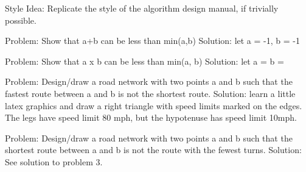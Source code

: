Style Idea: Replicate the style of the algorithm design manual, if trivially possible.

Problem: Show that a+b can be less than min(a,b)
Solution: let a = -1, b = -1

Problem: Show that a x b can be less than min(a, b)
Solution: let a = b = 

Problem: Design/draw a road network with two points a and b such that the fastest route between a and b is not the shortest route.
Solution: learn a little latex graphics and draw a right triangle with speed limits marked on the edges. The legs have speed limit 80 mph, but the hypotenuse has speed limit 10mph. 

Problem: Design/draw a road network with two points a and b such that the shortest route between a and b is not the route with the fewest turns.
Solution: See solution to problem 3.